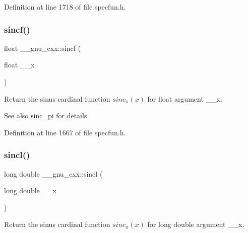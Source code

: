 Definition at line 1718 of file specfun.\+h.

\mbox{\label{group__gnu__math__spec__func_gaa87f0734cfe7823c932511ac2f0a876c}} 
\subsubsection{\texorpdfstring{sincf()}{sincf()}}
{\footnotesize\ttfamily float \+\_\+\+\_\+gnu\+\_\+cxx\+::sincf (\begin{DoxyParamCaption}\item[{float}]{\+\_\+\+\_\+x }\end{DoxyParamCaption})\hspace{0.3cm}{\ttfamily [inline]}}

Return the sinus cardinal function $ sinc_\pi(x) $ for {\ttfamily float} argument {\ttfamily \+\_\+\+\_\+x}.

\begin{DoxySeeAlso}{See also}
\hyperlink{group__gnu__math__spec__func_ga5195270024403b985e7d4f2f935f8779}{sinc\+\_\+pi} for details. 
\end{DoxySeeAlso}


Definition at line 1667 of file specfun.\+h.

\mbox{\label{group__gnu__math__spec__func_ga79a8fd931f5ad4f737e2931e636149ac}} 
\subsubsection{\texorpdfstring{sincl()}{sincl()}}
{\footnotesize\ttfamily long double \+\_\+\+\_\+gnu\+\_\+cxx\+::sincl (\begin{DoxyParamCaption}\item[{long double}]{\+\_\+\+\_\+x }\end{DoxyParamCaption})\hspace{0.3cm}{\ttfamily [inline]}}

Return the sinus cardinal function $ sinc_\pi(x) $ for {\ttfamily long double} argument {\ttfamily \+\_\+\+\_\+x}.

